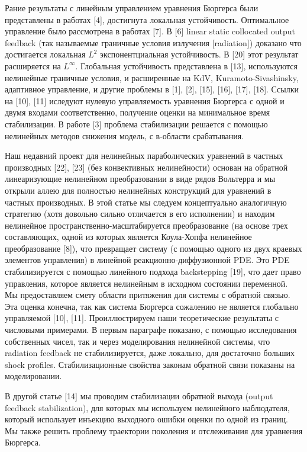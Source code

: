 Рание результаты с линейным управлением уравнения Бюргерса были представлены в работах [4], достигнута локальная устойчивость. Оптимальное управление было рассмотрена в работах [7]. В [6] linear static collocated output feedback (так называемые граничные условия излучения [radiation]) доказано что достигается локальная $L^2$ экспонентциальная устойчивость. В [20] этот результат расширяется на $L^{\infty}$. Глобальная устойчивость представлена в [13], используются нелинейные граничные условия, и расширенные на KdV, Kuramoto-Sivashinsky, адаптивное управление, и другие проблемы в [1], [2], [15], [16], [17], [18]. Ссылки на [10], [11] иследуют нулевую управляемость уравнения Бюргерса с одной и двумя входами соответственно, получение оценки на минимальное время стабилизации. В работе [3] проблема стабилизации решается с помощью нелинейных методов снижения модель, с в-области срабатывания.

Наш недавний проект для нелинейных параболических уравнений в частных производных [22], [23] (без конвективных нелинейности) основан на обратной линеаризующие нелинейном преобразовании в виде рядов Вольтерра и мы открыли аллею для полностью нелинейных конструкций для уравнений в частных производных. В этой статье мы следуем концептуально аналогичную стратегию (хотя довольно сильно отличается в его исполнении) и находим нелинейное пространственно-масштабируется преобразование (на основе трех составляющих, одной из которых является Коула-Хопфа нелинейное преобразование [8]), что превращает систему (с помощью одного из двух краевых элементов управления) в линейной реакционно-диффузионной PDE. Это PDE стабилизируется с помощью линейного подхода backstepping [19], что дает право управления, которое является нелинейным в исходном состоянии переменной. Мы предоставляем смету области притяжения для системы с обратной связью. Эта оценка конечна, так как система Бюргерса сожалению не является глобально управляемой [10], [11]. Проиллюстрируем наши теоретические результаты с числовыми примерами. В первым параграфе показано, с помощью исследования собственных чисел, так и через моделирования нелинейной системы, что radiation feedback не стабилизируется, даже локально, для достаточно больших shock profiles. Стабилизационные свойства законам обратной связи показаны на моделировании. 

В другой статье [14] мы проводим стабилизации обратной выхода (output feedback stabilization), для которых мы используем нелинейного наблюдателя, который использует инъекцию выходного ошибки оценки по одной из границ. Мы также решить проблему траектории поколения и отслеживания для уравнения Бюргерса.

